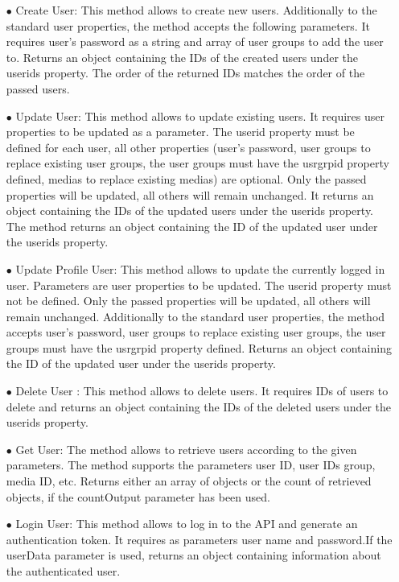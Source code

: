 \documentclass{article}
\begin{document}
\begin{itemize}
	\item[$\bullet$] 
Create User: This method allows to create new users. Additionally to the standard user properties, the method accepts the following parameters. It requires user's password as a  string and array of user groups to add the user to.  Returns an object containing the IDs of the created users under the userids property. The order of the returned IDs matches the order of the passed users.
	\item[$\bullet$] 
Update User: This method allows to update existing users. It requires user properties to be updated as a parameter. The userid property must be defined for each user, all other properties (user's password, user groups to replace existing user groups, the user groups must have the usrgrpid property defined, medias to replace existing medias) are optional. Only the passed properties will be updated, all others will remain unchanged. It returns an object containing the IDs of the updated users under the userids property. The method returns an object containing the ID of the updated user under the userids property.
	\item[$\bullet$] 
Update Profile User: This method allows to update the currently logged in user.  Parameters are user properties to be updated. The userid property must not be defined. Only the passed properties will be updated, all others will remain unchanged. Additionally to the standard user properties, the method accepts user's password, user groups to replace existing user groups, the user groups must have the usrgrpid property defined.  Returns an object containing the ID of the updated user under the userids property. 

 \item[$\bullet$]Delete User : This method allows to delete users. It requires IDs of users to delete and  returns an object containing the IDs of the deleted users under the userids property. 

\item[$\bullet$]Get User: The method allows to retrieve users according to the given parameters. The method supports the parameters  user ID, user IDs group, media ID, etc. Returns either an array of objects or the count of retrieved objects, if the countOutput parameter has been used.

\item[$\bullet$] Login User: This method allows to log in to the API and generate an authentication token.  It requires as  parameters user name and password.If the userData parameter is used, returns an object containing information about the authenticated user.


\end{itemize}
\end{document}
